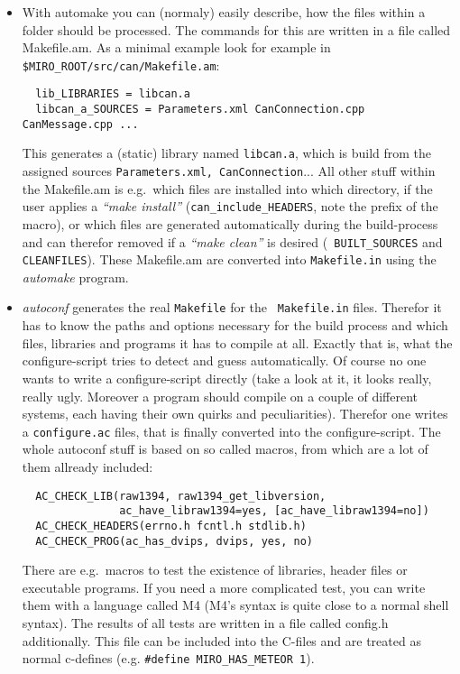 \begin{itemize}
\item With automake you can (normaly) easily describe, how the files
within a folder should be processed. The commands for this are written
in a file called Makefile.am. As a minimal example look for example in
{\tt \$MIRO\_ROOT/\-src/\-can/\-Makefile.am}:

\begin{verbatim}
  lib_LIBRARIES = libcan.a
  libcan_a_SOURCES = Parameters.xml CanConnection.cpp CanMessage.cpp ...
\end{verbatim}

This generates a (static) library named {\tt libcan.a}, which is build
from the assigned sources {\tt Parameters.xml, CanConnection}...  All
other stuff within the Makefile.am is e.g.\ which files are installed
into which directory, if the user applies a {\em "`make install"'\/}
({\tt can\_include\_HEADERS}, note the prefix of the macro), or which
files are generated automatically during the build-process and can
therefor removed if a {\em "`make clean"'\/} is desired ({\tt
BUILT\_SOURCES} and {\tt CLEANFILES}). These Makefile.am are converted
into {\tt Makefile.in} using the {\em automake\/} program.

\item {\em autoconf\/} generates the real {\tt Makefile} for the {\tt
Makefile.in} files. Therefor it has to know the paths and options
necessary for the build process and which files, libraries and
programs it has to compile at all. Exactly that is, what the
configure-script tries to detect and guess automatically. Of course no
one wants to write a configure-script directly (take a look at it, it
looks really, really ugly. Moreover a program should compile on a
couple of different systems, each having their own quirks and
peculiarities). Therefor one writes a {\tt configure.ac} files, that
is finally converted into the configure-script. The whole autoconf
stuff is based on so called macros, from which are a lot of them
allready included:

\begin{verbatim}
  AC_CHECK_LIB(raw1394, raw1394_get_libversion,
               ac_have_libraw1394=yes, [ac_have_libraw1394=no])
  AC_CHECK_HEADERS(errno.h fcntl.h stdlib.h)
  AC_CHECK_PROG(ac_has_dvips, dvips, yes, no)
\end{verbatim}

There are e.g.\ macros to test the existence of libraries, header files
or executable programs. If you need a more complicated test, you can
write them with a language called M4 (M4's syntax is quite close to a
normal shell syntax). The results of all tests are written in a file
called config.h additionally. This file can be included into the
C-files and are treated as normal c-defines (e.g. {\tt \#define
MIRO\_HAS\_METEOR 1}).
\end{itemize}


